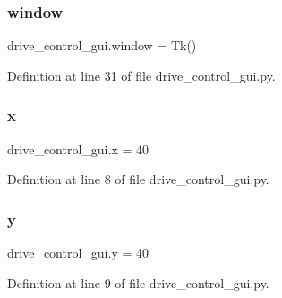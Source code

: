 \subsubsection{\texorpdfstring{window}{window}}
{\footnotesize\ttfamily drive\+\_\+control\+\_\+gui.\+window = Tk()}



Definition at line 31 of file drive\+\_\+control\+\_\+gui.\+py.

\mbox{\label{namespacedrive__control__gui_a96e208e07db52926c25b8ae59399bd92}} 
\subsubsection{\texorpdfstring{x}{x}}
{\footnotesize\ttfamily drive\+\_\+control\+\_\+gui.\+x = 40}



Definition at line 8 of file drive\+\_\+control\+\_\+gui.\+py.

\mbox{\label{namespacedrive__control__gui_af260d3b8db0d7fe75d2dd457382a1249}} 
\subsubsection{\texorpdfstring{y}{y}}
{\footnotesize\ttfamily drive\+\_\+control\+\_\+gui.\+y = 40}



Definition at line 9 of file drive\+\_\+control\+\_\+gui.\+py.

